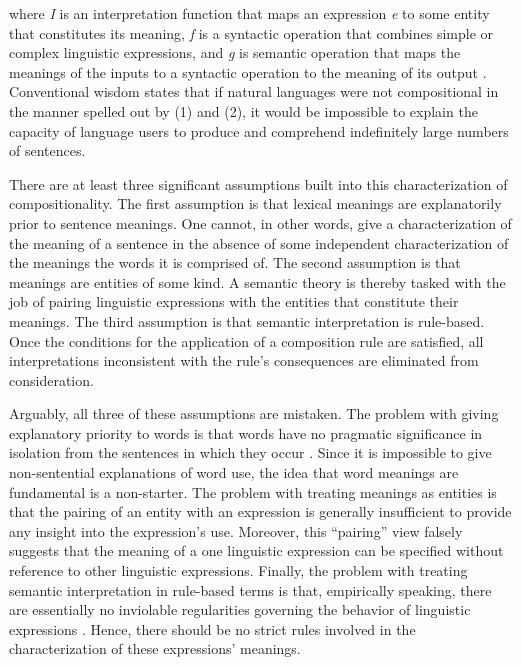 \noindent
where \textit{I} is an interpretation function that maps an expression \textit{e} to some entity that constitutes its meaning, \textit{f} is a syntactic operation that combines simple or complex linguistic expressions, and \textit{g} is semantic operation that maps the meanings of the inputs to a syntactic operation to the meaning of its output \citep{Szabo:2012}. Conventional wisdom states that if natural languages were not compositional in the manner spelled out by (1) and (2), it would be impossible to explain the capacity of language users to produce and comprehend indefinitely large numbers of sentences.

There are at least three significant assumptions built into this characterization of compositionality. The first assumption is that lexical meanings are explanatorily prior to sentence meanings. One cannot, in other words, give a characterization of the meaning of a sentence in the absence of some independent characterization of the meanings the words it is comprised of. The second assumption is that meanings are entities of some kind. A semantic theory is thereby tasked with the job of pairing linguistic expressions with the entities that constitute their meanings. The third assumption is that semantic interpretation is rule-based. Once the conditions for the application of a composition rule are satisfied, all interpretations inconsistent with the rule's consequences are eliminated from consideration.   

Arguably, all three of these assumptions are mistaken. The problem with giving explanatory priority to words is that words have no pragmatic significance in isolation from the sentences in which they occur \citep{Brandom:1994}. Since it is impossible to give non-sentential explanations of word use, the idea that word meanings are fundamental is a non-starter. The problem with treating meanings as entities is that the pairing of an entity with an expression is generally insufficient to provide any insight into the expression's use. Moreover, this ``pairing'' view falsely suggests that the meaning of a one linguistic expression can be specified without reference to other linguistic expressions. Finally, the problem with treating semantic interpretation in rule-based terms is that, empirically speaking, there are essentially no inviolable regularities governing the behavior of linguistic expressions \citep{SmolenskyLegendre:2006,Manning:2015,Seidenberg:1997}. Hence, there should be no strict rules involved in the characterization of these expressions' meanings. 

